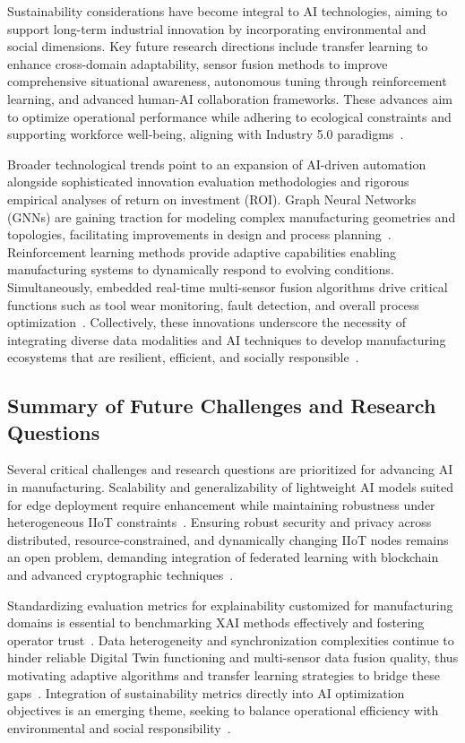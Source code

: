\documentclass[sigconf]{acmart}
\begin{document}
Sustainability considerations have become integral to AI technologies, aiming to support long-term industrial innovation by incorporating environmental and social dimensions. Key future research directions include transfer learning to enhance cross-domain adaptability, sensor fusion methods to improve comprehensive situational awareness, autonomous tuning through reinforcement learning, and advanced human-AI collaboration frameworks. These advances aim to optimize operational performance while adhering to ecological constraints and supporting workforce well-being, aligning with Industry 5.0 paradigms~\cite{ref5,ref6,ref7,ref44}.

Broader technological trends point to an expansion of AI-driven automation alongside sophisticated innovation evaluation methodologies and rigorous empirical analyses of return on investment (ROI). Graph Neural Networks (GNNs) are gaining traction for modeling complex manufacturing geometries and topologies, facilitating improvements in design and process planning~\cite{ref31}. Reinforcement learning methods provide adaptive capabilities enabling manufacturing systems to dynamically respond to evolving conditions. Simultaneously, embedded real-time multi-sensor fusion algorithms drive critical functions such as tool wear monitoring, fault detection, and overall process optimization~\cite{ref34,ref39}. Collectively, these innovations underscore the necessity of integrating diverse data modalities and AI techniques to develop manufacturing ecosystems that are resilient, efficient, and socially responsible~\cite{ref9,ref33}.

\subsection{Summary of Future Challenges and Research Questions}

Several critical challenges and research questions are prioritized for advancing AI in manufacturing. Scalability and generalizability of lightweight AI models suited for edge deployment require enhancement while maintaining robustness under heterogeneous IIoT constraints~\cite{ref30,ref38}. Ensuring robust security and privacy across distributed, resource-constrained, and dynamically changing IIoT nodes remains an open problem, demanding integration of federated learning with blockchain and advanced cryptographic techniques~\cite{ref6,ref25,ref41}.

Standardizing evaluation metrics for explainability customized for manufacturing domains is essential to benchmarking XAI methods effectively and fostering operator trust~\cite{ref30,ref38}. Data heterogeneity and synchronization complexities continue to hinder reliable Digital Twin functioning and multi-sensor data fusion quality, thus motivating adaptive algorithms and transfer learning strategies to bridge these gaps~\cite{ref26,ref39}. Integration of sustainability metrics directly into AI optimization objectives is an emerging theme, seeking to balance operational efficiency with environmental and social responsibility~\cite{ref41,ref44}.
\end{document}
